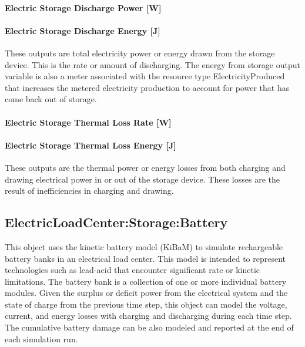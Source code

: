 \paragraph{Electric Storage Discharge Power {[}W{]}}\label{electric-storage-discharge-power-w}

\paragraph{Electric Storage Discharge Energy {[}J{]}}\label{electric-storage-discharge-energy-j}

These outputs are total electricity power or energy drawn from the storage device. This is the rate or amount of discharging. The energy from storage output variable is also a meter associated with the resource type ElectricityProduced that increases the metered electricity production to account for power that has come back out of storage.

\paragraph{Electric Storage Thermal Loss Rate {[}W{]}}\label{electric-storage-thermal-loss-rate-w}

\paragraph{Electric Storage Thermal Loss Energy {[}J{]}}\label{electric-storage-thermal-loss-energy-j}

These outputs are the thermal power or energy losses from both charging and drawing electrical power in or out of the storage device. These losses are the result of inefficiencies in charging and drawing.

\subsection{ElectricLoadCenter:Storage:Battery}\label{electricloadcenterstorage-battery}

This object uses the kinetic battery model (KiBaM) to simulate rechargeable battery banks in an electrical load center. This model is intended to represent technologies such as lead-acid that encounter significant rate or kinetic limitations. The battery bank is a collection of one or more individual battery modules. Given the surplus or deficit power from the electrical system and the state of charge from the previous time step, this object can model the voltage, current, and energy losses with charging and discharging during each time step. The cumulative battery damage can be also modeled and reported at the end of each simulation run.

